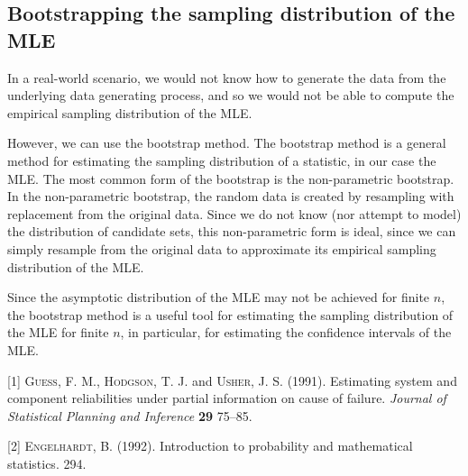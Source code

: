 \documentclass[
]{article}
\newenvironment{cslreferences}%
  {}%
  {\par}
\begin{document}
\hypertarget{sec:boot}{%
\subsection{Bootstrapping the sampling distribution of the
MLE}\label{sec:boot}}

In a real-world scenario, we would not know how to generate the data
from the underlying data generating process, and so we would not be able
to compute the empirical sampling distribution of the MLE.

However, we can use the bootstrap method. The bootstrap method is a
general method for estimating the sampling distribution of a statistic,
in our case the MLE. The most common form of the bootstrap is the
non-parametric bootstrap. In the non-parametric bootstrap, the random
data is created by resampling with replacement from the original data.
Since we do not know (nor attempt to model) the distribution of
candidate sets, this non-parametric form is ideal, since we can simply
resample from the original data to approximate its empirical sampling
distribution of the MLE.

Since the asymptotic distribution of the MLE may not be achieved for
finite \(n\), the bootstrap method is a useful tool for estimating the
sampling distribution of the MLE for finite \(n\), in particular, for
estimating the confidence intervals of the MLE.

\hypertarget{refs}{}
\begin{cslreferences}
\leavevmode\hypertarget{ref-Fran-1991}{}%
{[}1{]} \textsc{Guess}, F. M., \textsc{Hodgson}, T. J. and
\textsc{Usher}, J. S. (1991). Estimating system and component
reliabilities under partial information on cause of failure.
\emph{Journal of Statistical Planning and Inference} \textbf{29} 75--85.

\leavevmode\hypertarget{ref-bain}{}%
{[}2{]} \textsc{Engelhardt}, B. (1992). Introduction to probability and
mathematical statistics. 294.
\end{cslreferences}
\end{document}

